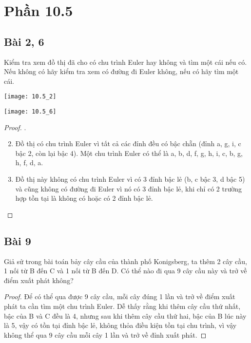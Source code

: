 \section*{Phần 10.5}
\subsection*{Bài 2, 6}
Kiểm tra xem đồ thị đã cho có chu trình Euler hay không và tìm một cái nếu có. Nếu không có hãy kiểm tra xem có đường đi Euler không, nếu có hãy tìm một cái.
\begin{minipage}{7cm}
	\texttt{[image: 10.5\_2]}
\end{minipage}
\begin{minipage}{7cm}
	\texttt{[image: 10.5\_6]}
\end{minipage}
\begin{proof}.
	\begin{enumerate}
		\setcounter{enumi}{1}
		\item Đồ thị có chu trình Euler vì tất cả các đỉnh đều có bậc chẵn (đỉnh a, g, i, c bậc 2, còn lại bậc 4). Một chu trình Euler có thể là a, b, d, f, g, h, i, c, b, g, h, f, d, a.
		\setcounter{enumi}{5}
		\item Đồ thị này không có chu trình Euler vì có 3 đỉnh bậc lẻ (b, c bậc 3, d bậc 5) và cũng không có đường đi Euler vì nó có 3 đỉnh bậc lẻ, khi chỉ có 2 trường hợp tồn tại là không có hoặc có 2 đỉnh bậc lẻ.
	\end{enumerate}
\end{proof}
\subsection*{Bài 9}
Giả sử trong bài toán bảy cây cầu của thành phố Konigsberg, ta thêm 2 cây cầu, 1 nối từ B đến C và 1 nối từ B đến D. Có thể nào đi qua 9 cây cầu này và trở về điểm xuất phát không?
\begin{proof}
Để có thể qua được 9 cây cầu, mỗi cây đúng 1 lần và trở về điểm xuất phát ta cần tìm một chu trình Euler. Dễ thấy rằng khi thêm cây cầu thứ nhất, bậc của B và C đều là 4, nhưng sau khi thêm cây cầu thứ hai, bậc của B lúc này là 5, vậy có tồn tại đỉnh bậc lẻ, không thỏa điều kiện tồn tại chu trình, vì vậy không thể qua 9 cây cầu mỗi cây 1 lần và trở về đỉnh xuất phát.
\end{proof}
